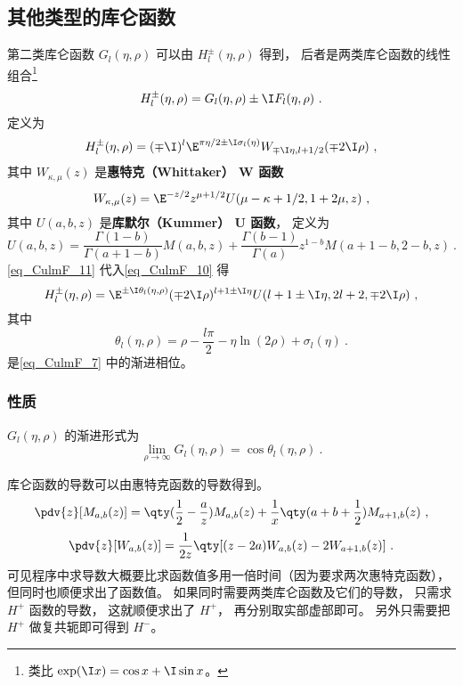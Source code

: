 \subsection{其他类型的库仑函数}

第二类库仑函数 $G_l(\eta, \rho)$ 可以由 $H_l^\pm(\eta, \rho)$ 得到， 后者是两类库仑函数的线性组合\footnote{类比 $\exp(\I x) = \cos x + \I\sin x$。}
\begin{equation}
H_l^\pm(\eta, \rho) = G_l(\eta, \rho) \pm \I F_l(\eta, \rho)~.
\end{equation}	
定义为
\begin{equation}\label{eq_CulmF_10}
H_l^\pm(\eta, \rho) = (\mp\I)^l \E^{\pi\eta/2 \pm \I \sigma_l(\eta)} W_{\mp\I\eta, l + 1/2}(\mp 2\I\rho)~,
\end{equation}
其中 $W_{\kappa, \mu}(z)$ 是\textbf{惠特克（Whittaker） W 函数}
\begin{equation}\label{eq_CulmF_11}
W_{\kappa, \mu}(z) = \E^{-z/2} z^{\mu + 1/2} U(\mu - \kappa + 1/2, 1 + 2\mu, z)~,
\end{equation}
其中 $U(a, b, z)$ 是\textbf{库默尔（Kummer） U 函数}， 定义为
\begin{equation}
U(a, b, z) = \frac{\Gamma(1 - b)}{\Gamma(a + 1 - b)} M(a, b, z) + \frac{\Gamma(b - 1)}{\Gamma(a)} z^{1 - b} M(a + 1 - b, 2 - b, z)~.
\end{equation}
\autoref{eq_CulmF_11} 代入\autoref{eq_CulmF_10} 得
\begin{equation}
H_l^\pm(\eta, \rho) = \E^{\pm\I\theta_l(\eta, \rho)}(\mp 2\I\rho)^{l + 1 \pm\I\eta} U(l + 1 \pm \I\eta, 2l + 2, \mp2\I\rho)~,
\end{equation}
其中
\begin{equation}
\theta_l(\eta, \rho) = \rho - \frac{l\pi}{2} - \eta\ln(2\rho) + \sigma_l(\eta)~.
\end{equation}
是\autoref{eq_CulmF_7} 中的渐进相位。

\subsubsection{性质}
$G_l(\eta,\rho)$ 的渐进形式为
\begin{equation}
\lim_{\rho\to \infty} G_l(\eta, \rho) = \cos\theta_l(\eta, \rho)~.
\end{equation}

库仑函数的导数可以由惠特克函数的导数得到。
\begin{equation}
\pdv{z} [M_{a, b}(z)] = \qty(\frac12 - \frac{a}{z}) M_{a, b}(z) + \frac{1}{x} \qty(a + b + \frac12) M_{a+1, b}(z)~,
\end{equation}
\begin{equation}
\pdv{z} [W_{a, b}(z)] = \frac{1}{2z} \qty[(z - 2a) W_{a, b}(z) - 2W_{a+1, b}(z)]~.
\end{equation}
可见程序中求导数大概要比求函数值多用一倍时间（因为要求两次惠特克函数）， 但同时也顺便求出了函数值。 如果同时需要两类库仑函数及它们的导数， 只需求 $H^+$ 函数的导数， 这就顺便求出了 $H^+$， 再分别取实部虚部即可。 另外只需要把 $H^+$ 做复共轭即可得到 $H^-$。

